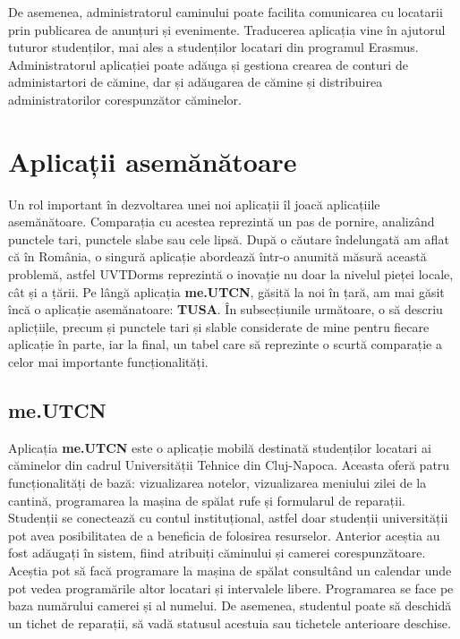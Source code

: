 \documentclass[12pt,a4paper]{report}
\theoremstyle{definition}
\theoremstyle{remark}
\begin{document}
\par De asemenea, administratorul caminului poate facilita comunicarea cu locatarii prin publicarea de anunțuri și evenimente. Traducerea aplicația vine în ajutorul tuturor studenților, mai ales a studenților locatari din programul Erasmus. Administratorul aplicației poate adăuga și gestiona crearea de conturi de administartori de cămine, dar și adăugarea de cămine și distribuirea administratorilor corespunzător căminelor.

\section{Aplicații asemănătoare}
\par Un rol important în dezvoltarea unei noi aplicații îl joacă aplicațiile asemănătoare. Comparația cu acestea reprezintă un pas de pornire, analizând punctele tari, punctele slabe sau cele lipsă. După o căutare îndelungată am aflat că în România, o singură aplicație abordează într-o anumită măsură această problemă, astfel UVTDorms reprezintă o inovație nu doar la nivelul pieței locale, cât și a țării. Pe lângă aplicația \textbf{me.UTCN}, găsită la noi în țară, am mai găsit încă o aplicație asemănatoare: \textbf{TUSA}.  În subsecțiunile următoare, o să descriu aplicțiile, precum și punctele tari și slable considerate de mine pentru fiecare aplicație în parte, iar la final, un tabel care să reprezinte o scurtă comparație a celor mai importante funcționalități.

\subsection{me.UTCN}
\par Aplicația \textbf{me.UTCN} este o aplicație mobilă destinată studenților locatari ai căminelor  din cadrul Universității Tehnice din Cluj-Napoca. Aceasta oferă patru funcționalități de bază: vizualizarea notelor, vizualizarea meniului zilei de la cantină, programarea la mașina de spălat rufe și formularul de reparații. Studenții se conectează cu contul instituțional, astfel doar studenții universității pot avea posibilitatea de a beneficia de folosirea resurselor. Anterior aceștia au fost adăugați în sistem, fiind atribuiți căminului și camerei corespunzătoare. Aceștia pot să facă programare la mașina de spălat consultând un calendar unde pot vedea programările altor locatari și intervalele libere. Programarea se face pe baza numărului camerei și al numelui. De asemenea, studentul poate să deschidă un tichet de reparații, să vadă statusul acestuia sau tichetele anterioare deschise.
\end{document}
